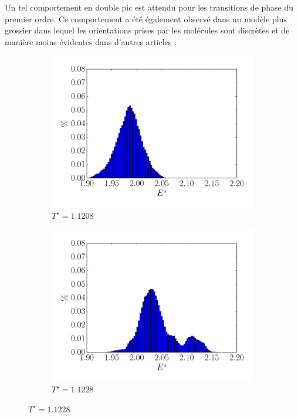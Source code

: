 \documentclass[11pt,a4paper]{article}
\numberwithin{equation}{section}
\begin{document}
Un tel comportement en double pic est attendu pour les transitions de phase du premier ordre. Ce comportement a été également observé dans un modèle plus grossier \cite{model} dans lequel les orientations prises par les molécules sont discrètes et de manière moins évidentes dans d'autres articles \cite{fabbri}.

\begin{figure}
\center
    \begin{subfigure}[b]{0.49\textwidth}
    	\center
    	\includegraphics[scale=0.4]{figures/histo_11208.pdf}
    	\caption{$T^\star =1.1208$}
    	\label{11208}
    \end{subfigure}	
	\begin{subfigure}[b]{0.49\textwidth}
    	\center
    	\includegraphics[scale=0.4]{figures/histo_11228.pdf}
    	\caption{$T^\star =1.1228$}
    	\label{11228}
    \end{subfigure}
    

\end{figure}
\end{document}
